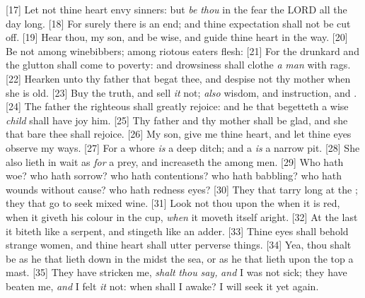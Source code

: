 [17] \textcolor[cmyk]{0.99998,1,0,0}{Let not thine heart envy sinners: but \emph{be} \emph{thou} in the fear  the LORD all the day long.}
[18] \textcolor[cmyk]{0.99998,1,0,0}{For surely there is an end; and thine expectation shall not be cut off.}
[19] \textcolor[cmyk]{0.99998,1,0,0}{Hear thou, my son, and be wise, and guide thine heart in the way.}
[20] \textcolor[cmyk]{0.99998,1,0,0}{Be not among winebibbers; among riotous eaters  flesh:}
[21] \textcolor[cmyk]{0.99998,1,0,0}{For the drunkard and the glutton shall come to poverty: and drowsiness shall clothe \emph{a} \emph{man} with rags.}
[22] \textcolor[cmyk]{0.99998,1,0,0}{Hearken unto thy father that begat thee, and despise not thy mother when she is old.}
[23] \textcolor[cmyk]{0.99998,1,0,0}{Buy the truth, and sell \emph{it} not; \emph{also} wisdom, and instruction, and  .}
[24] \textcolor[cmyk]{0.99998,1,0,0}{The father  the righteous shall greatly rejoice: and he that begetteth a wise \emph{child} shall have joy  him.}
[25] \textcolor[cmyk]{0.99998,1,0,0}{Thy father and thy mother shall be glad, and she that bare thee shall rejoice.}
[26] \textcolor[cmyk]{0.99998,1,0,0}{My son, give me thine heart, and let thine eyes observe my ways.}
[27] \textcolor[cmyk]{0.99998,1,0,0}{For a whore \emph{is} a deep ditch; and a   \emph{is} a narrow pit.}
[28] \textcolor[cmyk]{0.99998,1,0,0}{She also lieth in wait as \emph{for} a prey, and increaseth the   among men.}
[29] \textcolor[cmyk]{0.99998,1,0,0}{Who hath woe? who hath sorrow? who hath contentions? who hath babbling? who hath wounds without cause? who hath redness  eyes?}
[30] \textcolor[cmyk]{0.99998,1,0,0}{They that tarry long at the  ; they that go to seek mixed wine.}
[31] \textcolor[cmyk]{0.99998,1,0,0}{Look not thou upon the   when it is red, when it giveth his colour in the cup, \emph{when} it moveth itself aright.}
[32] \textcolor[cmyk]{0.99998,1,0,0}{At the last it biteth like a serpent, and stingeth like an adder.}
[33] \textcolor[cmyk]{0.99998,1,0,0}{Thine eyes shall behold strange women, and thine heart shall utter perverse things.}
[34] \textcolor[cmyk]{0.99998,1,0,0}{Yea, thou shalt be as he that lieth down in the midst  the sea, or as he that lieth upon the top  a mast.}
[35] \textcolor[cmyk]{0.99998,1,0,0}{They have stricken me, \emph{shalt} \emph{thou} \emph{say,} \emph{and} I was not sick; they have beaten me, \emph{and} I felt \emph{it} not: when shall I awake? I will seek it yet again.}


